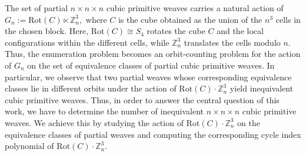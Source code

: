 \documentclass[12pt]{article}
\theoremstyle{definition}
\theoremstyle{remark}
\begin{document}
The set of partial $n\times n\times n$ cubic primitive weaves carries a natural action of
$G_n:=\mathrm{Rot}(C)\ltimes \mathbb Z_n^3,$
where $C$ is the cube obtained as the union of the $n^3$ cells in the
chosen block. Here, $\mathrm{Rot}(C)\cong S_4$ rotates the cube $C$ and
the local configurations within the different cells, while $\mathbb Z_n^3$ translates the cells modulo
$n$. Thus, the enumeration problem becomes an orbit-counting problem for
the action of $G_n$ on the set of equivalence classes of partial cubic primitive weaves.
In particular, we observe that two partial weaves whose corresponding equivalence classes lie in different orbits under the action of $\mathrm{Rot}(C) \cdot \mathbb{Z}_n^3$ yield inequivalent cubic primitive weaves. Thus, in order to answer the central question of this work, we have to determine the number of inequivalent $n {\times} n {\times} n$ cubic primitive weaves.
We achieve this by studying the action of $\mathrm{Rot}(C) \cdot \mathbb{Z}_n^3$ on the equivalence classes of partial weaves and computing the corresponding cycle index polynomial of $\mathrm{Rot}(C) \cdot \mathbb{Z}_n^3$.
\end{document}
